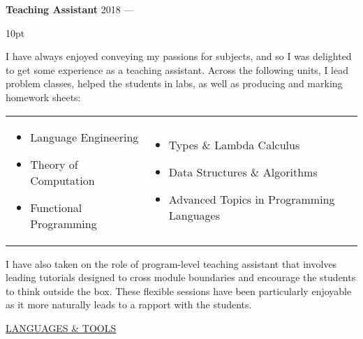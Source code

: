 \documentclass{article}
\newenvironment{tight-list}[1]{
  \vspace{5pt}
  \begin{adjustwidth}{15pt}{0pt}
  \begin{itemize}
    \setlength{\itemsep}{#1}
    \setlength{\parskip}{0pt}
    \setlength{\parsep}{0pt} 
}
{
  \end{itemize}
  \end{adjustwidth}
  \vspace{15pt}
}
\begin{document}
\textbf{Teaching Assistant} \hfill 2018 --- \phantom{2021}
\begin{tight-list}{10pt}
\item I have always enjoyed conveying my passions for subjects, and so I was delighted to get some experience as a teaching assistant. Across the following units, I lead problem classes, helped the students in labs, as well as producing and marking homework sheets:

\begin{tabular}{p{}p{}}
  \begin{itemize}
    \item Language Engineering
    \item Theory of Computation
    \item Functional Programming
  \end{itemize}
   &
  \begin{itemize}
    \item Types \& Lambda Calculus
    \item Data Structures \& Algorithms
    \item Advanced Topics in Programming Languages
  \end{itemize}
\end{tabular}
\vspace{-10pt}

\item I have also taken on the role of program-level teaching assistant that involves leading tutorials designed to cross module boundaries and encourage the students to think outside the box. These flexible sessions have been particularly enjoyable as it more naturally leads to a rapport with the students.
\end{tight-list}

\vspace{5pt}

\uline{{\large LANGUAGES \& TOOLS}\hfill}
\vspace{10pt}
\end{document}
